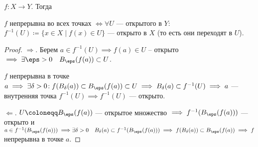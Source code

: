 \begin{theorem}
    $f\!: X \to Y$. Тогда

     $f$ непрерывна во всех точках  $\iff \forall U$ --- открытого в $Y$:  $f^{-1}(U) \coloneqq \{ x \in X \mid f(x) \in U\}$ --- открыто в $X$ (то есть они переходят в $U$). 
\end{theorem}
\begin{proof}
    $\Rightarrow$. Берем  $a \in f^{-1}(U) \implies f(a) \in U$ -- открыто  $\implies \exists \eps > 0\quad B_\eps(f(a)) \subset U$.

    $f$ непрерывна в точке  $a \implies \exists \delta > 0\!: f(B_\delta(a)) \subset B_\eps(f(a)) \subset U \implies B_\delta(a) \subset f^{-1}(U) \implies a$ --- внутренняя точка  $f^{-1}(U) \implies f^{-1}(U)$ --- открыто.

     $\Leftarrow$.  $U \coloneqq B_\eps(f(a))$ --- открытое множество  $\implies f^{-1}(B_\eps(f(a)))$ --- открыто и  $a \in f^{-1}(B_\eps(f(a))) \implies\\
     \exists \delta > 0\quad B_\delta(a) \subset f^{-1}(B_\eps(f(a))) \implies f(B_\delta(a)) \subset B_\eps(f(a)) \implies f$ непрерывна в точке  $a$.
\end{proof}
